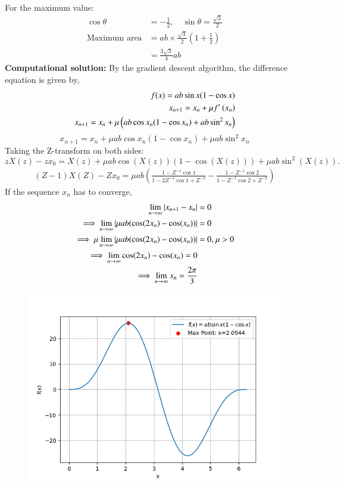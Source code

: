 \documentclass[journal]{IEEEtran}
\begin{document}
	For the maximum value:
	\begin{align}
		\cos\theta &= -\frac{1}{2}, \quad \sin\theta = \frac{\sqrt{3}}{2} \\
		\text{Maximum area} &= ab \times \frac{\sqrt{3}}{2} \left( 1 + \frac{1}{2} \right) \\
		&= \frac{3\sqrt{3}}{4} ab
	\end{align}
	\textbf{Computational solution:}
	\newline
	By the gradient descent algorithm, the difference equation is given by,
	\begin{align}
		f(x)=ab \sin{x} (1 - \cos{x})\\
		x_{n + 1} = x_n + \mu f^{\prime}\left(x_{n}\right)\\
		x_{n + 1} = x_n + \mu \left(ab \cos{x_{n}} (1 - \cos{x_{n}}) + ab \sin^2{x_{n}}\right)
	\end{align}
	\[
	x_{n+1} = x_n + \mu ab \cos x_n (1 - \cos x_n) + \mu ab \sin^2 x_n
	\]
	Taking the Z-transform on both sides:
	\[
	zX(z) - zx_0 = X(z) + \mu ab \cos(X(z))(1 - \cos(X(z))) + \mu ab \sin^2(X(z)).
	\]
	\begin{align}
		(Z-1)X(Z)-Zx_{0}={\mu}ab\left(\frac{1-Z^{-1}\cos{1}}{1-2Z^{-1}\cos{1}+Z^{-2}}-\frac{1-Z^{-1}\cos{2}}{1-Z^{-1}\cos{2}+Z^{-2}}\right)
	\end{align}
	If the sequence $x_n$ has to converge,
	\begin{align}
		\lim_{n\to\infty} \left\vert x_{n + 1} - x_n\right\vert &= 0\\
		\implies \lim_{n\to\infty} \left\vert{\mu}ab(\cos(2x_{n})-\cos(x_{n}))\right\vert &= 0\\
		\implies \mu \lim_{n\to\infty} \left\vert{\mu}ab(\cos(2x_{n})-\cos(x_{n}))\right\vert &= 0 \text{, } \mu > 0\\
		\implies \lim_{n\to\infty} \cos(2x_{n})-\cos(x_{n}) = 0\\
		\implies \lim_{n\to\infty} x_{n} = \frac{2\pi}{3}
	\end{align}
	
	\begin{figure}[h!]
		\centering
		\includegraphics[width=0.7\columnwidth]{figs/Fig1.png}
		\label{label}
	\end{figure}
	
\end{document}
